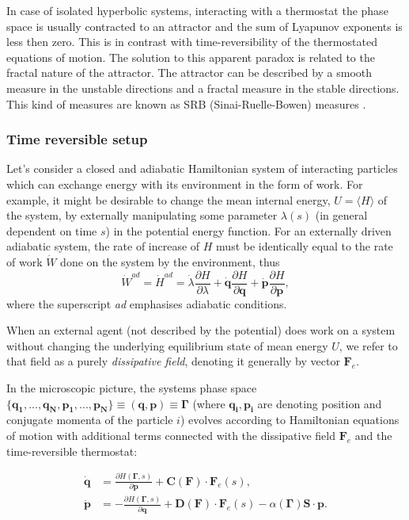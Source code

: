 \documentclass[a4paper,12pt]{article}
\begin{document}
In case of isolated hyperbolic systems, interacting with a thermostat the phase space is usually contracted to an attractor and the sum of Lyapunov exponents is less then zero.
This is in contrast with time-reversibility of the thermostated equations of motion. The solution to this apparent paradox is related to the fractal nature of the attractor.
The attractor can be described by a smooth measure in the unstable directions and a fractal measure in the stable directions.
This kind of measures are known as SRB (Sinai-Ruelle-Bowen) measures \cite{Dorfman:ozm67-zD}.

\subsubsection{Time reversible setup}
Let's consider a closed and adiabatic Hamiltonian system of interacting particles which can exchange energy with its environment in the form of work. For example, it might be desirable to change the mean internal energy, $U=\langle H \rangle$ of the system, by externally manipulating some parameter $\lambda(s)$ (in general dependent on time $s$) in the potential energy function. 
For an externally driven adiabatic system, the rate of increase of $H$ must be identically equal to the rate of work $\dot{W}$ done on the system by the environment, thus
\begin{equation}
\label{AdiabaticWork}
  \dot{W}^{ad} = \dot{H}^{ad} = \dot{\lambda} \frac{\partial{H}}{\partial{\lambda}} +\dot{\bm{q}}\frac{\partial{H}}{\partial{\bm{q}}} +\dot{\bm{p}}\frac{\partial{H}}{\partial{\bm{p}}},
\end{equation}
where the superscript \textit{ad} emphasises adiabatic conditions. 

When an external agent (not described by the potential) does work on a system without changing the underlying equilibrium state of mean energy $U$, we refer to that field as a purely \textit{dissipative field}, denoting it generally by vector $\bm{F}_e$.

In the microscopic picture, the systems phase space $\{\bm{q_1},...,\bm{q_N},\bm{p_1},...,\bm{p_N} \} \equiv (\bm{q},\bm{p})\equiv \bm{\Gamma} $ (where $\bm{q_i}, \bm{p_i} $ are denoting position and conjugate momenta of the particle $i$) evolves according to Hamiltonian equations of motion with additional terms connected with the dissipative field $\bm{F}_e$ and the time-reversible thermostat:

\begin{equation}
\begin{aligned}
\label{ThermostattedEq}
  \dot{\bm{q}} &=\frac{\partial H(\bm{\Gamma},s)}{\partial{\bm{p}}}+\bm{C}(\bm{F})\cdot\bm{F}_e(s), \\
  \dot{\bm{p}} &=- \frac{\partial H(\bm{\Gamma},s)}{\partial{\bm{q}}}+\bm{D}(\bm{F})\cdot\bm{F}_e(s) - \alpha(\bm{\Gamma})\bm{S}\cdot\bm{p}.
\end{aligned}
\end{equation}
\end{document}
